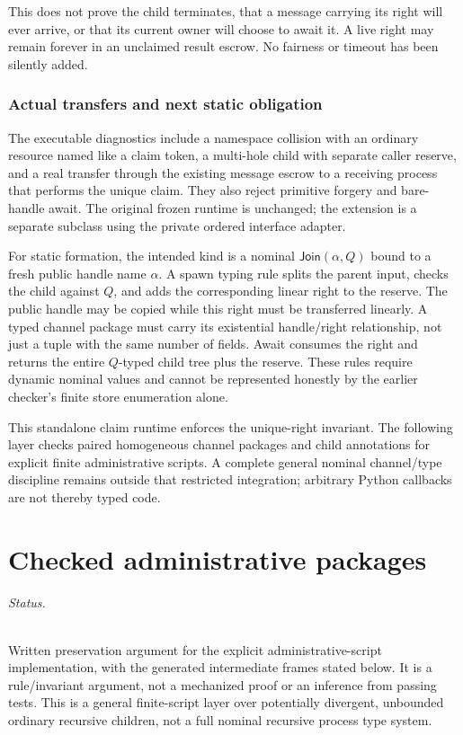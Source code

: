 \documentclass[11pt]{article}
\begin{document}
This does not prove the child terminates, that a message carrying its right will ever arrive, or that its current owner will choose to await it. A live right may remain forever in an unclaimed result escrow. No fairness or timeout has been silently added.

\section{Actual transfers and next static obligation}
The executable diagnostics include a namespace collision with an ordinary resource named like a claim token, a multi-hole child with separate caller reserve, and a real transfer through the existing message escrow to a receiving process that performs the unique claim. They also reject primitive forgery and bare-handle await. The original frozen runtime is unchanged; the extension is a separate subclass using the private ordered interface adapter.

For static formation, the intended kind is a nominal $\mathsf{Join}(\alpha,Q)$ bound to a fresh public handle name $\alpha$. A spawn typing rule splits the parent input, checks the child against $Q$, and adds the corresponding linear right to the reserve. The public handle may be copied while this right must be transferred linearly. A typed channel package must carry its existential handle/right relationship, not just a tuple with the same number of fields. Await consumes the right and returns the entire $Q$-typed child tree plus the reserve. These rules require dynamic nominal values and cannot be represented honestly by the earlier checker's finite store enumeration alone.

This standalone claim runtime enforces the unique-right invariant. The following layer checks paired homogeneous channel packages and child annotations for explicit finite administrative scripts. A complete general nominal channel/type discipline remains outside that restricted integration; arbitrary Python callbacks are not thereby typed code.

\part{Checked administrative packages}

\paragraph{Status.} Written preservation argument for the explicit administrative-script implementation, with the generated intermediate frames stated below. It is a rule/invariant argument, not a mechanized proof or an inference from passing tests. This is a general finite-script layer over potentially divergent, unbounded ordinary recursive children, not a full nominal recursive process type system.
\end{document}
